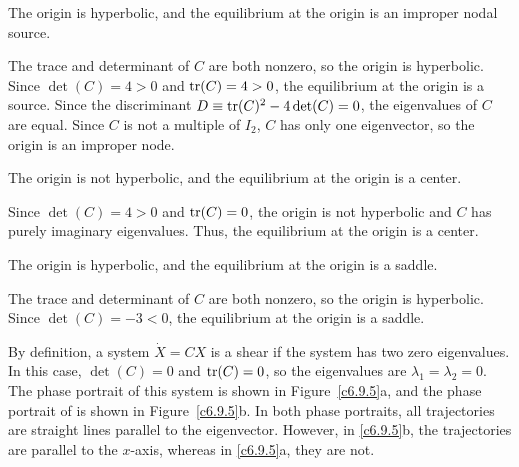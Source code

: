  \ans The origin is hyperbolic, and the equilibrium at the origin
is an improper nodal source.

\soln The trace and determinant of $C$ are both nonzero, so the origin
is hyperbolic.  Since $\det(C) = 4 > 0$ and ${\rm tr}(C) = 4 > 0$,
the equilibrium at the origin is a source.  Since the discriminant
$D \equiv {\rm tr}(C)^2 - 4\det(C) = 0$, the eigenvalues of $C$ are equal.
Since $C$ is not a multiple of $I_2$, $C$ has only one eigenvector, so
the origin is an improper node.

 \ans The origin is not hyperbolic, and the equilibrium at
the origin is a center.

\soln Since $\det(C) = 4 > 0$ and ${\rm tr}(C) = 0$, the origin is not
hyperbolic and $C$ has purely imaginary eigenvalues.  Thus, the
equilibrium at the origin is a center.

 \ans The origin is hyperbolic, and the equilibrium at the origin
is a saddle.

\soln The trace and determinant of $C$ are both nonzero, so the origin
is hyperbolic.  Since $\det(C) = -3 < 0$, the equilibrium at the origin 
is a saddle.

By definition, a system $\dot{X} = CX$ is a shear if the system has two
zero eigenvalues.  In this case, $\det(C) = 0$ and ${\rm tr}(C) = 0$, so
the eigenvalues are $\lambda_1 = \lambda_2 = 0$.  The phase portrait of
this system is shown in Figure~\ref{c6.9.5}a, and the phase portrait of
 is shown in Figure~\ref{c6.9.5}b.  In both phase portraits,
all trajectories are straight lines parallel to the eigenvector.  However,
in \ref{c6.9.5}b, the trajectories are parallel to the $x$-axis, whereas
in \ref{c6.9.5}a, they are not.

\begin{figure}[htb]
                       \centerline{%
                       }
\end{figure}





